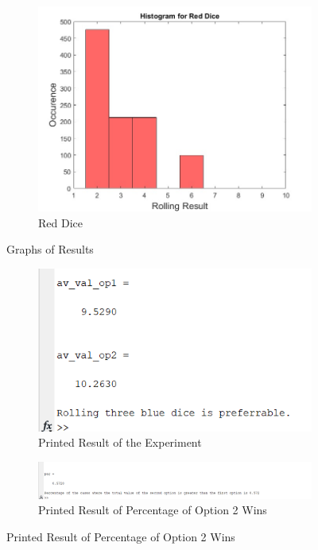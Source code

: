 \documentclass[12pt]{article}
\begin{document}
\begin{figure}[h!]
\begin{subfigure}[b]{0.4\linewidth}
    \includegraphics[width=\linewidth]{red.jpg}
    \caption{Red Dice}
   \end{subfigure}
  \caption{Graphs of Results}
  \label{fig:coffee}
\end{figure}

\begin{figure}[h!]
  \centering
  \begin{subfigure}[b]{0.4\linewidth}
    \includegraphics[width=\linewidth]{print.jpg}
    \caption{Printed Result of the Experiment}
  \end{subfigure}
  \begin{subfigure}[b]{0.4\linewidth}
   \includegraphics[width=\linewidth]{avg.png}
   \caption{Printed Result of Percentage of Option 2 Wins}
  \end{subfigure}
\end{figure}
\end{document}
